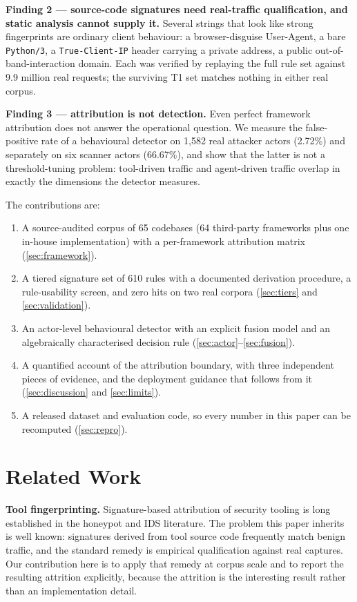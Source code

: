 \documentclass[11pt]{article}
\begin{document}
\textbf{Finding 2 --- source-code signatures need real-traffic qualification, and static
analysis cannot supply it.} Several strings that look like strong fingerprints are ordinary
client behaviour: a browser-disguise User-Agent, a bare \texttt{Python/3}, a
\texttt{True-Client-IP} header carrying a private address, a public out-of-band-interaction
domain. Each was verified by replaying the full rule set against 9.9 million real requests;
the surviving T1 set matches nothing in either real corpus.

\textbf{Finding 3 --- attribution is not detection.} Even perfect framework attribution does
not answer the operational question. We measure the false-positive rate of a behavioural
detector on 1,582 real attacker actors (2.72\%) and separately on six scanner actors
(66.67\%), and show that the latter is not a threshold-tuning problem: tool-driven traffic and
agent-driven traffic overlap in exactly the dimensions the detector measures.

The contributions are:
\begin{enumerate}
\item A source-audited corpus of 65 codebases (64 third-party frameworks plus one in-house
implementation) with a per-framework attribution matrix
(\ref{sec:framework}).
\item A tiered signature set of 610 rules with a documented derivation procedure, a
rule-usability screen, and zero hits on two real corpora (\ref{sec:tiers} and
\ref{sec:validation}).
\item An actor-level behavioural detector with an explicit fusion model and an algebraically
characterised decision rule (\ref{sec:actor}--\ref{sec:fusion}).
\item A quantified account of the attribution boundary, with three independent pieces of
evidence, and the deployment guidance that follows from it (\ref{sec:discussion} and
\ref{sec:limits}).
\item A released dataset and evaluation code, so every number in this paper can be recomputed
(\ref{sec:repro}).
\end{enumerate}

\section{Related Work}
\label{sec:related}

\textbf{Tool fingerprinting.} Signature-based attribution of security tooling is long
established in the honeypot and IDS literature. The problem this paper inherits is well known:
signatures derived from tool source code frequently match benign traffic, and the standard
remedy is empirical qualification against real captures. Our contribution here is to apply
that remedy at corpus scale and to report the resulting attrition explicitly, because the
attrition is the interesting result rather than an implementation detail.
\end{document}
